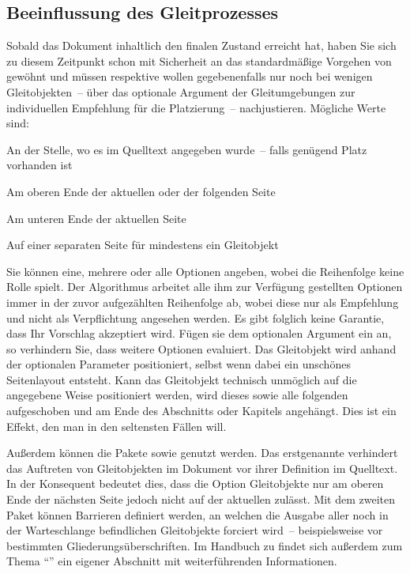 \documentclass[%
  english,ngerman,%
  geometry=no,DIV=12,automark,%
]{tudscrartcl}
\begin{document}
\subsection{Beeinflussung des Gleitprozesses}
Sobald das Dokument inhaltlich den finalen Zustand erreicht hat, haben Sie sich 
zu diesem Zeitpunkt schon mit Sicherheit an das standardmäßige Vorgehen von 
 gewöhnt und müssen respektive wollen gegebenenfalls nur noch bei 
wenigen Gleitobjekten~-- über das optionale Argument der Gleitumgebungen zur
individuellen Empfehlung für die Platzierung~-- nachjustieren. Mögliche Werte 
sind:
%
\begin{description}[labelindent=\parindent,leftmargin=*,style=nextline]
\item[\POParameter{h} (here)]
  An der Stelle, wo es im Quelltext angegeben wurde~-- falls genügend Platz 
  vorhanden ist
\item[\POParameter{t} (top)]
  Am oberen Ende der aktuellen oder der folgenden Seite
\item[\POParameter{b} (bottom)]
  Am unteren Ende der aktuellen Seite
\item[\POParameter{p} (page)]
  Auf einer separaten Seite für mindestens ein Gleitobjekt
\end{description}
%
Sie können eine, mehrere oder alle Optionen angeben, wobei die Reihenfolge 
keine Rolle spielt. Der Algorithmus arbeitet alle ihm zur Verfügung gestellten 
Optionen immer in der zuvor aufgezählten Reihenfolge ab, wobei diese nur als 
Empfehlung und nicht als Verpflichtung angesehen werden. Es gibt folglich keine 
Garantie, dass Ihr Vorschlag akzeptiert wird. Fügen sie dem optionalen Argument 
ein \PValue{!} an, so verhindern Sie, dass  weitere Optionen 
evaluiert. Das Gleitobjekt wird anhand der optionalen Parameter positioniert, 
selbst wenn dabei ein unschönes Seitenlayout entsteht. Kann das Gleitobjekt 
technisch unmöglich auf die angegebene Weise positioniert werden, wird dieses 
sowie alle folgenden aufgeschoben und am Ende des Abschnitts oder Kapitels 
angehängt. Dies ist ein Effekt, den man in den seltensten Fällen will. 

Außerdem können die Pakete  sowie  genutzt 
werden. Das erstgenannte verhindert das Auftreten von Gleitobjekten im Dokument 
vor ihrer Definition im Quelltext. In der Konsequent bedeutet dies, dass die 
Option  Gleitobjekte nur am oberen Ende der nächsten Seite 
jedoch nicht auf der aktuellen zulässt. Mit dem zweiten Paket können Barrieren 
definiert werden, an welchen die Ausgabe aller noch in der Warteschlange 
befindlichen Gleitobjekte forciert wird~-- beispielsweise vor bestimmten 
Gliederungsüberschriften. Im Handbuch zu \TUDScript findet sich außerdem zum 
Thema \enquote{} 
ein eigener Abschnitt mit weiterführenden Informationen.
\end{document}
